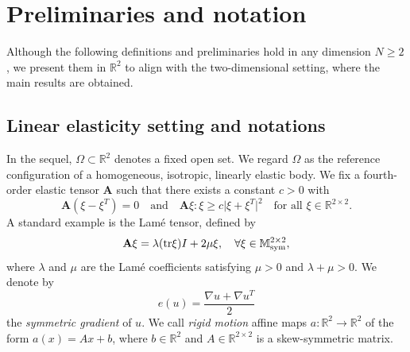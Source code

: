 \documentclass[12pt]{article}
\theoremstyle{definition}
\theoremstyle{remark}
\numberwithin{equation}{section}
\newcommand{\abs}[1]{\lvert #1 \rvert}
\newcommand{\R}{\mathbb{R}}
\newcommand{\D}{\nabla}
\newcommand{\A}{\mathbf{A}}
\begin{document}
\section{Preliminaries and notation}\label{preliminaries}

Although the following definitions and preliminaries hold in any dimension $N \geq 2$, we present them in $\R^2$ to
align with the two-dimensional setting, where the main results are obtained. 

\subsection{Linear elasticity setting and notations}

In the sequel, $\Omega \subset \R^2$ denotes a fixed open set.
We regard $\Omega$ as the reference configuration of a homogeneous, isotropic, linearly elastic body.
We fix a fourth-order elastic tensor $\A$ such that there exists a constant $c > 0$ with
\begin{equation}
    \A(\xi - \xi^T) = 0 \quad \text{and} \quad \A \xi : \xi \geq c \abs{\xi + \xi^T}^2
    \quad \text{for all $\xi \in \R^{2 \times 2}$}.
\end{equation}
A standard example is the Lamé tensor, defined by
\begin{equation}
    \A \xi=\lambda ({\rm tr}\xi) I+2 \mu \xi, \quad \forall\xi \in \mathbb M^{2 \times 2}_{\rm sym},
\end{equation}
where $\lambda$ and $\mu$ are the Lam\'e coefficients satisfying $\mu>0$ and $\lambda+\mu>0$. 
We denote by
\begin{equation}
    e(u)=\frac{\D u+\D u^T}{2}
\end{equation}
the \emph{symmetric gradient} of $u$. We call \emph{rigid motion} affine maps $a \colon \R^2 \longrightarrow \R^2$ of
the form $a(x) = Ax+b$, where $b \in \R^2$ and $A \in \R^{2 \times 2}$ is a skew-symmetric matrix.
\end{document}
